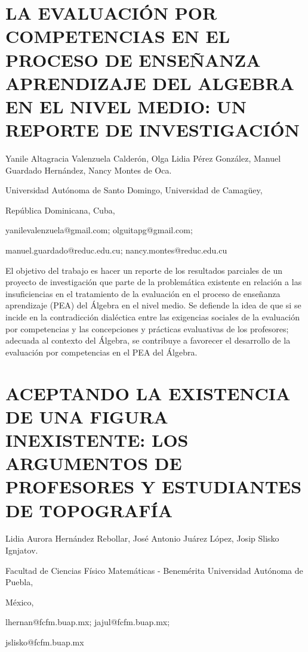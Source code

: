 \section{LA EVALUACIÓN POR COMPETENCIAS EN EL PROCESO DE ENSEÑANZA APRENDIZAJE
DEL ALGEBRA EN EL NIVEL MEDIO: UN REPORTE DE INVESTIGACIÓN }

\begin{datos}

Yanile Altagracia Valenzuela Calderón, Olga Lidia Pérez González,
Manuel Guardado Hernández, Nancy Montes de Oca.

Universidad Autónoma de Santo Domingo, Universidad de Camagüey,

República Dominicana, Cuba,

yanilevalenzuela@gmail.com; olguitapg@gmail.com;

manuel.guardado@reduc.edu.cu; nancy.montes@reduc.edu.cu 

\end{datos}

El objetivo del trabajo es hacer un reporte de los resultados parciales
de un proyecto de investigación que parte de la problemática existente
en relación a las insuficiencias en el tratamiento de la evaluación
en el proceso de enseñanza aprendizaje (PEA) del Álgebra en el nivel
medio. Se defiende la idea de que si se incide en la contradicción
dialéctica entre las exigencias sociales de la evaluación por competencias
y las concepciones y prácticas evaluativas de los profesores; adecuada
al contexto del Álgebra, se contribuye a favorecer el desarrollo de
la evaluación por competencias en el PEA del Álgebra. 


\section{ACEPTANDO LA EXISTENCIA DE UNA FIGURA INEXISTENTE: LOS ARGUMENTOS
DE PROFESORES Y ESTUDIANTES DE TOPOGRAFÍA}

\begin{datos}

Lidia Aurora Hernández Rebollar, José Antonio Juárez López, Josip
Slisko Ignjatov.

Facultad de Ciencias Físico Matemáticas - Benemérita Universidad Autónoma
de Puebla,

México, 

lhernan@fcfm.buap.mx; jajul@fcfm.buap.mx;

jslisko@fcfm.buap.mx 

\end{datos}

